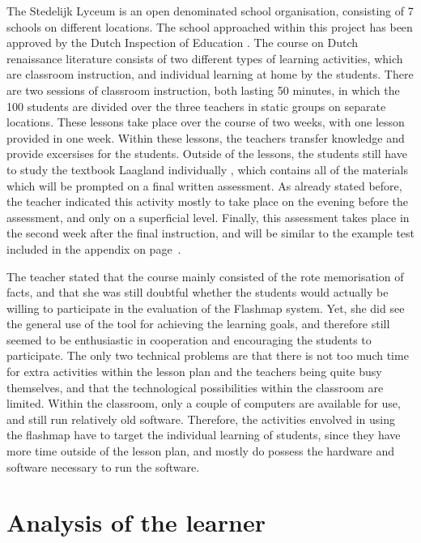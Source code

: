 The Stedelijk Lyceum is an open denominated school organisation, consisting of 7 schools on different locations. The school approached within this project has been approved by the Dutch Inspection of Education \cite{inspectierapport}. The course on Dutch renaissance literature consists of two different types of learning activities, which are classroom instruction, and individual learning at home by the students. There are two sessions of classroom instruction, both lasting 50 minutes, in which the 100 students are divided over the three teachers in static groups on separate locations. These lessons take place over the course of two weeks, with one lesson provided in one week. Within these lessons, the teachers transfer knowledge and provide excersises for the students. Outside of the lessons, the students still have to study the textbook Laagland individually \cite{laagland}, which contains all of the materials which will be prompted on a final written assessment. As already stated before, the teacher indicated this activity mostly to take place on the evening before the assessment, and only on a superficial level. Finally, this assessment takes place in the second week after the final instruction, and will be similar to the example test included in the appendix on page~\pageref{app:exampletest}.

The teacher stated that the course mainly consisted of the rote memorisation of facts, and that she was still doubtful whether the students would actually be willing to participate in the evaluation of the Flashmap system. Yet, she did see the general use of the tool for achieving the learning goals, and therefore still seemed to be enthusiastic in cooperation and encouraging the students to participate. The only two technical problems are that there is not too much time for extra activities within the lesson plan and the teachers being quite busy themselves, and that the technological possibilities within the classroom are limited. Within the classroom, only a couple of computers are available for use, and still run relatively old software. Therefore, the activities envolved in using the flashmap have to target the individual learning of students, since they have more time outside of the lesson plan, and mostly do possess the hardware and software necessary to run the software.

\section{Analysis of the learner}
\label{sec:learneranalysis}

